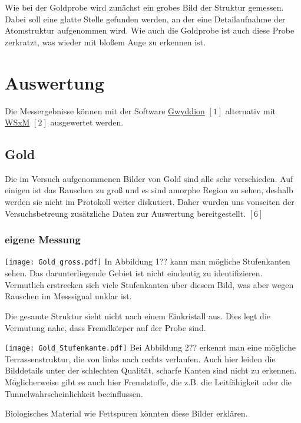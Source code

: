 \documentclass[12pt,a4paper]{scrartcl}
\numberwithin{equation}{section} %
\renewcommand{\[}{} %
\renewcommand{\]}{\noindent} %
\begin{document}
Wie bei der Goldprobe wird zunächst ein grobes Bild der Struktur
gemessen. Dabei soll eine glatte Stelle gefunden werden, an der eine
Detailaufnahme der Atomstruktur aufgenommen wird. Wie auch die Goldprobe
ist auch diese Probe zerkratzt, was wieder mit bloßem Auge zu erkennen
ist.

\hypertarget{auswertung}{%
\section{Auswertung}\label{auswertung}}

Die Messergebnisse können mit der Software
\href{http://gwyddion.net}{Gwyddion} \([1]\) alternativ mit
\href{http://www.wsxm.eu}{WSxM} \([2]\) ausgewertet werden.

\hypertarget{gold-1}{%
\subsection{Gold}\label{gold-1}}

Die im Versuch aufgenommenen Bilder von Gold sind alle sehr verschieden.
Auf einigen ist das Rauschen zu groß und es sind amorphe Region zu
sehen, deshalb werden sie nicht im Protokoll weiter diskutiert. Daher
wurden uns vonseiten der Versuchsbetreung zusätzliche Daten zur
Auswertung bereitgestellt. \([6]\)

\hypertarget{eigene-messung}{%
\subsubsection{eigene Messung}\label{eigene-messung}}

\texttt{[image: Gold\_gross.pdf]} In Abbildung 1?? kann man mögliche
Stufenkanten sehen. Das darunterliegende Gebiet ist nicht eindeutig zu
identifizieren. Vermutlich erstrecken sich viele Stufenkanten über
diesem Bild, was aber wegen Rauschen im Messsignal unklar ist.

Die gesamte Struktur sieht nicht nach einem Einkristall aus. Dies legt
die Vermutung nahe, dass Fremdkörper auf der Probe sind.

\texttt{[image: Gold\_Stufenkante.pdf]} Bei Abbildung 2?? erkennt man
eine mögliche Terrassenstruktur, die von links nach rechts verlaufen.
Auch hier leiden die Bilddetails unter der schlechten Qualität, scharfe
Kanten sind nicht zu erkennen. Möglicherweise gibt es auch hier
Fremdstoffe, die z.B. die Leitfähigkeit oder die
Tunnelwahrscheinlichkeit beeinflussen.

Biologisches Material wie Fettspuren könnten diese Bilder erklären.
\end{document}
